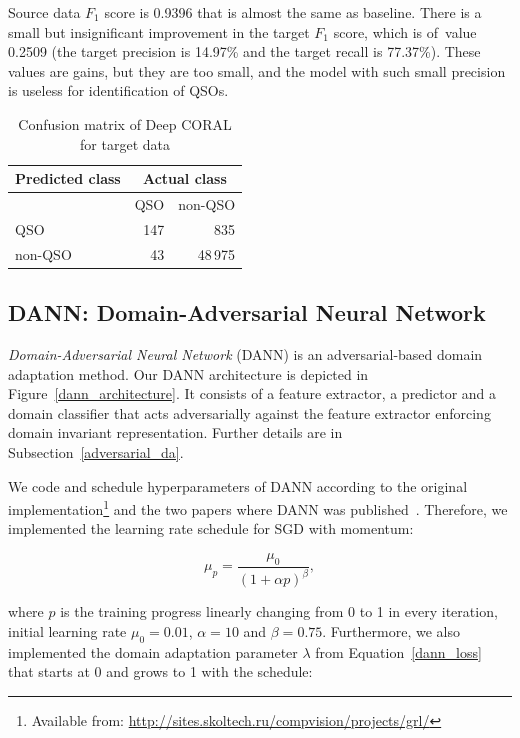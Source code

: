 Source data \(F_1\) score is 0.9396 that is almost the same as baseline.
There is a small but insignificant improvement in the target \(F_1\) score,
which is of~value 0.2509
(the target precision is 14.97\% and the target recall is 77.37\%).
These values are gains, but they are too small,
and the model with such small precision is useless for identification of QSOs.

\begin{table}
\begin{center}
\begin{tabular}{|l|r|r|}
	\hline
	Predicted class & \multicolumn{2}{c|}{Actual class} \\
	\hline \hline
	& QSO & non-QSO \\ \hline
	QSO & 147 & 835 \\ \hline
	non-QSO & 43 & 48\,975 \\ \hline
\end{tabular}
\end{center}
\caption{Confusion matrix of Deep CORAL for target data}
\end{table}

\subsection{DANN: Domain-Adversarial Neural Network}

\textit{Domain-Adversarial Neural Network} (DANN) is an adversarial-based domain adaptation method.
Our DANN architecture is depicted in Figure~\ref{dann_architecture}.
It consists of a feature extractor, a predictor and a domain classifier
that acts adversarially against the feature extractor
enforcing domain invariant representation.
Further details are in Subsection~\ref{adversarial_da}.

We code and schedule hyperparameters of DANN according to the original
implementation\footnote{Available from: \url{http://sites.skoltech.ru/compvision/projects/grl/}}
and the two papers where DANN was published~\cite{ganin2016, ganin2015}.
Therefore, we implemented the learning rate schedule for SGD with momentum:

\begin{equation}
	\mu_p = \frac{\mu_0}{(1 + \alpha p)^\beta},
\end{equation}

where \(p\) is the training progress linearly changing from 0 to 1 in every iteration,
initial learning rate \(\mu_0 = 0.01\), \(\alpha = 10\) and \(\beta = 0.75\).
Furthermore, we also implemented the domain adaptation parameter \(\lambda\) from Equation~\ref{dann_loss} that starts at 0 and grows to 1 with the schedule:

